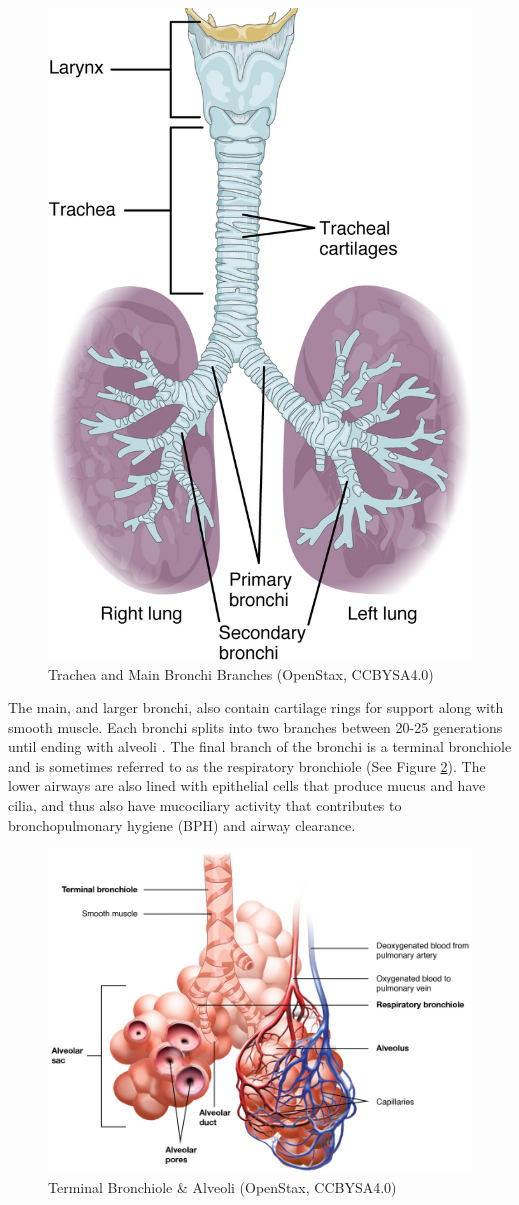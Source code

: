 \begin{figure}[!h]
    \centering
    \includegraphics[width=0.4 \linewidth]{./figure/ventilation/lower_airways.jpg}
    \caption{Trachea and Main Bronchi Branches \footnotesize{(OpenStax, CCBYSA4.0)}}
    \label{fig:lower_airways}
\end{figure}

The main, and larger bronchi, also contain cartilage rings for support along with smooth muscle. Each bronchi splits into two branches between 20-25 generations until ending with alveoli \cite{hall_guyton_2020}. The final branch of the bronchi is a terminal bronchiole and is sometimes referred to as the respiratory bronchiole (See Figure \ref{fig:alveoli}). The lower airways are also lined with epithelial cells that produce mucus and have cilia, and thus also have mucociliary activity that contributes to bronchopulmonary hygiene (BPH) and airway clearance. 

\begin{figure}[!h]
    \centering
    \includegraphics[width=0.7 \linewidth]{./figure/ventilation/alveoli.jpg}
    \caption{Terminal Bronchiole \& Alveoli \footnotesize{(OpenStax, CCBYSA4.0)}}
    \label{fig:alveoli}
\end{figure}


